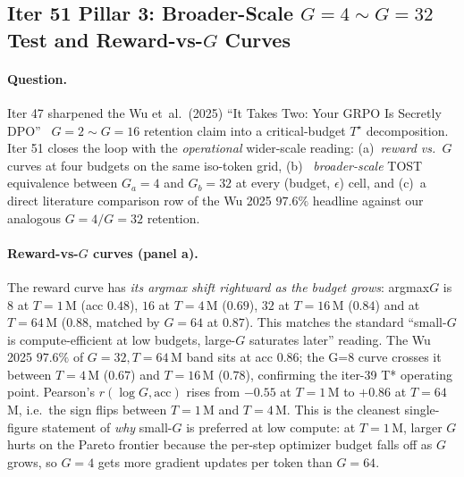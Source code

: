 \subsection{Iter 51 Pillar 3: Broader-Scale $G{=}4 \sim G{=}32$ Test and Reward-vs-$G$ Curves}
\label{sec:group-size-iter51}

\paragraph{Question.}
Iter 47 sharpened the Wu et~al.\ (2025) ``It Takes Two: Your GRPO Is
Secretly DPO''~\citep{wu2025grpo_dpo} $G{=}2\sim G{=}16$ retention claim
into a critical-budget $T^\star$ decomposition.  Iter 51 closes the
loop with the \emph{operational} wider-scale reading: (a)~\emph{reward
vs.\ $G$} curves at four budgets on the same iso-token grid, (b)~
\emph{broader-scale} TOST equivalence between $G_a{=}4$ and
$G_b{=}32$ at every (budget, $\epsilon$) cell, and (c)~a direct
literature comparison row of the Wu 2025 $97.6\%$ headline against
our analogous $G{=}4/G{=}32$ retention.

\paragraph{Reward-vs-$G$ curves (panel a).}
The reward curve has \emph{its argmax shift rightward as the budget
grows}: argmax$G$ is $8$ at $T{=}1$\,M (acc $0.48$), $16$ at
$T{=}4$\,M ($0.69$), $32$ at $T{=}16$\,M ($0.84$) and at $T{=}64$\,M
($0.88$, matched by $G{=}64$ at $0.87$).  This matches the standard
``small-$G$ is compute-efficient at low budgets, large-$G$ saturates
later'' reading.  The Wu 2025 $97.6\%$ of $G{=}32,T{=}64$\,M band sits
at acc $0.86$; the G=8 curve crosses it between $T{=}4$\,M ($0.67$)
and $T{=}16$\,M ($0.78$), confirming the iter-39 T* operating point.
Pearson's $r(\log G, \text{acc})$ rises from $-0.55$ at $T{=}1$\,M to
$+0.86$ at $T{=}64$\,M, i.e.\ the sign flips between $T{=}1$\,M and
$T{=}4$\,M.  This is the cleanest single-figure statement of
\emph{why} small-$G$ is preferred at low compute: at $T{=}1$\,M,
larger $G$ hurts on the Pareto frontier because the per-step optimizer
budget falls off as $G$ grows, so $G{=}4$ gets more gradient updates
per token than $G{=}64$.

